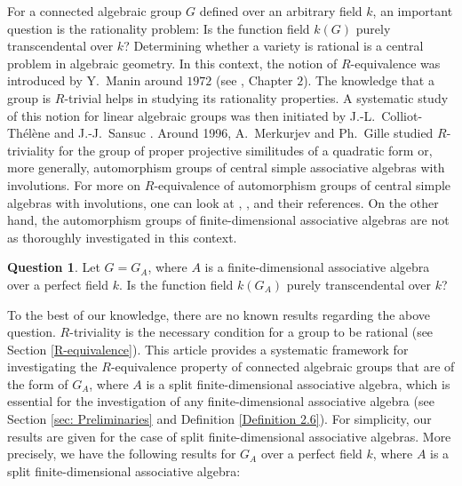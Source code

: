 \documentclass[12pt]{amsart}
\theoremstyle{definition}
\newtheorem{question}[theorem]{Question}
\numberwithin{equation}{section}
\begin{document}
\vspace{0.2in}
\noindent
For a connected algebraic group $G$ defined over an arbitrary field $k$, an important question is the rationality problem: Is the function field $k(G)$ purely transcendental over $k$? Determining whether a variety is rational is a central problem in algebraic geometry. In this context, the notion of $R$-equivalence was introduced by Y.~Manin around $1972$ (see \cite{Manin}, Chapter $2$). The knowledge that a group is $R$-trivial helps in studying its rationality properties. A systematic study of this notion for linear algebraic groups was then initiated by J.-L.~Colliot-Thélène and J.-J.~Sansuc \cite{CTS}. Around 1996, A.~Merkurjev \cite{AM2} and Ph.~Gille \cite{Gille2} studied $R$-triviality for the group of proper projective similitudes of a quadratic form or, more generally, automorphism groups of central simple associative algebras with involutions. For more on $R$-equivalence of automorphism groups of central simple algebras with involutions, one can look at \cite{PA}, \cite{AP}, \cite{Preeti} and their references. On the other hand, the automorphism groups of finite-dimensional associative algebras are not as thoroughly investigated in this context.
\vskip2mm 
\begin{question}
Let $G=G_A$, where $A$ is a finite-dimensional associative algebra over a perfect field $k$. Is the function field $k(G_A)$ purely transcendental over $k$?  
\end{question}
\vskip2mm
To the best of our knowledge, there are no known results regarding the above question. $R$-triviality is the necessary condition for a group to be rational (see Section \ref{R-equivalence}). This article provides a systematic framework for investigating the $R$-equivalence property of connected algebraic groups that are of the form of $G_A$, where $A$ is a split finite-dimensional associative algebra, which is essential for the investigation of any finite-dimensional associative algebra (see Section \ref{sec: Preliminaries} and Definition \ref{Definition 2.6}). For simplicity, our results are given for the case of split finite-dimensional associative algebras. More precisely, we have the following results for $G_A$ over a perfect field $k$, where $A$ is a split finite-dimensional associative algebra:
\vspace{0.2in}
\end{document}
